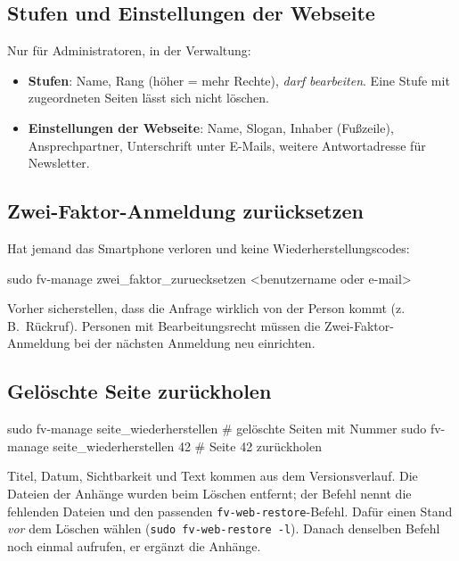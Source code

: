 \documentclass[a4paper,fontsize=10pt]{scrartcl}
\newcommand*{\cmd}[1]{\texttt{#1}}
\begin{document}
\subsection{Stufen und Einstellungen der Webseite}

Nur für Administratoren, in der Verwaltung:
\begin{itemize}
  \item \textbf{Stufen}: Name, Rang (höher = mehr Rechte), \emph{darf bearbeiten}.
        Eine Stufe mit zugeordneten Seiten lässt sich nicht löschen.
  \item \textbf{Einstellungen der Webseite}: Name, Slogan, Inhaber (Fußzeile),
        Ansprechpartner, Unterschrift unter E-Mails, weitere Antwortadresse für
        Newsletter.
\end{itemize}

\subsection{Zwei-Faktor-Anmeldung zurücksetzen}

Hat jemand das Smartphone verloren und keine Wiederherstellungscodes:

\begin{befehl}
sudo fv-manage zwei_faktor_zuruecksetzen <benutzername oder e-mail>
\end{befehl}

Vorher sicherstellen, dass die Anfrage wirklich von der Person kommt (z.\,B.\
Rückruf). Personen mit Bearbeitungsrecht müssen die Zwei-Faktor-Anmeldung bei der
nächsten Anmeldung neu einrichten.

\subsection{Gelöschte Seite zurückholen}

\begin{befehl}
sudo fv-manage seite_wiederherstellen          # gelöschte Seiten mit Nummer
sudo fv-manage seite_wiederherstellen 42       # Seite 42 zurückholen
\end{befehl}

Titel, Datum, Sichtbarkeit und Text kommen aus dem Versionsverlauf. Die Dateien der
Anhänge wurden beim Löschen entfernt; der Befehl nennt die fehlenden Dateien und
den passenden \cmd{fv-web-restore}-Befehl. Dafür einen Stand \emph{vor} dem Löschen
wählen (\cmd{sudo fv-web-restore -l}). Danach denselben Befehl noch einmal aufrufen,
er ergänzt die Anhänge.
\end{document}
